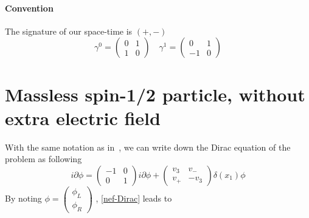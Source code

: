 \paragraph{Convention}
The signature of our space-time is $(+, -)$
\begin{equation*}
\gamma^0 = \begin{pmatrix}
0 & 1 \\
1 & 0 \end{pmatrix}  \quad  \gamma^1 = \begin{pmatrix}
0  & 1 \\
-1 & 0
\end{pmatrix}
\end{equation*}
\section{Massless spin-1/2 particle, without extra electric field}\label{sect-nef}
With the same notation as in~\cite{Zahn2015}, we can write down the Dirac equation of the problem as following
\begin{equation}\label{nef-Dirac}
i \partial \phi = 
\begin{pmatrix} 
-1 & 0 \\
0 & 1 
\end{pmatrix} i \partial \phi +
\begin{pmatrix}
v_3 & v_- \\
v_+ & -v_3
\end{pmatrix} \delta(x_1) \phi
\end{equation}
By noting $\phi =
\begin{pmatrix}
\phi_L \\
\phi_R
\end{pmatrix}$
, \cref{nef-Dirac} leads to

